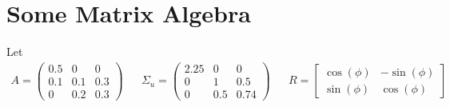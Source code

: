 \documentclass[a4paper]{scrartcl}
\newif\ifpartSVAR
\begin{document}
\ifpartSVAR %
    
    
    \section{Some Matrix Algebra}
    Let
    \begin{align*}
        A = \begin{pmatrix}0.5 &0 &0 \\0.1&0.1&0.3\\0&0.2&0.3 \end{pmatrix} &  & \Sigma_u = \begin{pmatrix}2.25 & 0 & 0\\ 0 & 1 & 0.5\\ 0 & 0.5 & 0.74 \end{pmatrix} &  & R = \begin{bmatrix} \cos(\phi) & -\sin(\phi)\\ \sin(\phi) & \cos(\phi) \end{bmatrix}
    \end{align*}
\end{document}
